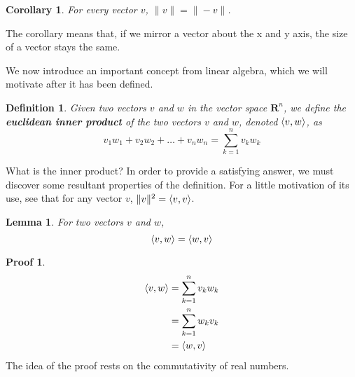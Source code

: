 \documentclass[12pt]{amsbook}
\theoremstyle{plain}
\newtheorem{definition}{Definition}
\newtheorem{lemma}[theorem]{Lemma}
\newtheorem{corollary}[theorem]{Corollary}
\theoremstyle{definition}
\newtheorem*{prf}{Proof}
\DeclarePairedDelimiter{\inner}{\langle}{\rangle}
\begin{document}
\begin{center}

\theoremstyle{definition}
\end{center}

\begin{corollary}
  For every vector $v$, $\| v \| = \| -v \|$.
\end{corollary}

The corollary means that, if we mirror a vector about the x and y axis, the size of a vector stays the same.

\begin{center}
\end{center}

We now introduce an important concept from linear algebra, which we will motivate after it has been defined.

\begin{definition}
Given two vectors $v$ and $w$ in the vector space $\mathbf{R}^n$, we define the {\bf euclidean inner product} of the two vectors $v$ and $w$, denoted $\inner{v, w}$, as
%
\[ v_1w_1 + v_2w_2 + \dots + v_nw_n = \sum_{k = 1}^n v_k w_k \]
\end{definition}

What is the inner product? In order to provide a satisfying answer, we must discover some resultant properties of the definition. For a little motivation of its use, see that for any vector $v$, $\|v\|^2 = \inner{v, v}$.

\begin{lemma}
  For two vectors $v$ and $w$,
  \[ \inner{v, w} = \inner{w, v} \]
\end{lemma}
\begin{prf}
  \begin{align*}
    \inner{v, w} &= \sum_{k=1}^n v_k w_k\\
                 &= \sum_{k=1}^n w_k v_k\\
                 &= \inner{w, v}
  \end{align*}
  The idea of the proof rests on the commutativity of real numbers.
\end{prf}
\end{document}
